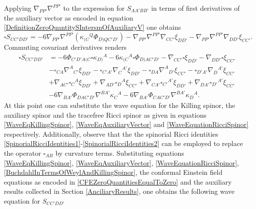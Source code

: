 \documentclass[10pt,a4paper]{article}
\theoremstyle{plain}
\begin{document}
 Applying $\nabla_{PP'}\nabla^{PP'}$ to the expression for
 $S_{AA'BB'}$ in terms of first derivatives of the auxiliary vector as
 encoded in equation
 \eqref{DefinitionZeroQuantitySIntersmOfAuxiliaryV} one obtains
\begin{equation}
\square
S_{CC'DD'}=-6\nabla_{PP'}\nabla^{PP'}(\kappa_{(C}{}^{Q}\Phi_{D)QC'D'})
-\nabla_{PP'}\nabla^{PP'}\nabla_{CC'}\xi_{DD'} -
\nabla_{PP'}\nabla^{PP'} \nabla_{DD'}\xi_{CC'}.
\end{equation}
Commuting covariant derivatives renders
\begin{align*}
\square S_{CC'DD'}&= -6 \Phi_{C'D'A(C} \square \kappa_{D)}{}^{A}-6
\kappa_{(C}{}^{A}\square \Phi_{D)AC'D'} -\nabla_{CC'}\square
\xi_{DD'}-\nabla_{DD'}\square \xi_{CC'}\\ &- \square_
   {CA}\nabla^{A}{}_{C'}\xi_{DD'} - \square_
   {C'A'}\nabla_{C}{}^{A'}\xi_{DD'} - \square_ {DA}\nabla^{A}{}_
   {D'}\xi_{CC'} - \square_ {D'A'}\nabla_{D}{}^{A'}\xi_{CC'}\\ & +
   \nabla_{AC'}\square_{C}{}^{A}\xi_{DD'} +
   \nabla_{AD'}\square_{D}{}^{A}\xi_{CC'} +
   \nabla_{CA'}\square_{C'}{}^{A'}\xi_{DD'}+\nabla_{DA'}\square_{D'}{}^{A'}\xi_{CC'}\\ &
   -6 \nabla_{BA'}\Phi_{DAC'D'} \nabla^{BA'}\kappa_{C}{}^{A} -6
   \nabla_{BA'}\Phi_{CAC'D'} \nabla^{BA'}\kappa_{D}{}^{A} .
\end{align*}
At this point one can substitute the wave equation for the Killing
spinor, the auxiliary spinor and the tracefree Ricci spinor as given
in equations \eqref{WaveEqKillingSpinor},
\eqref{WaveEqAuxiliaryVector} and \eqref{WaveEquationRicciSpinor}
respectively. Additionally, observe that the the spinorial Ricci
identities
\eqref{SpinorialRicciIdentities1}-\eqref{SpinorialRicciIdentities2}
can be employed to replace the operator $\square_{AB}$ by curvature
terms.  Substituting equations \eqref{WaveEqKillingSpinor},
\eqref{WaveEqAuxiliaryVector}, \eqref{WaveEquationRicciSpinor},
\eqref{BuchdahlInTermsOfWeylAndKillingSpinor}, the conformal
Einstein field equations as encoded in
\eqref{CFEZeroQuantitiesEqualToZero} and the auxiliary results
collected in Section \ref{AnciliaryResults}, one obtains the
 following wave
equation for $S_{CC'DD'}$
\end{document}
